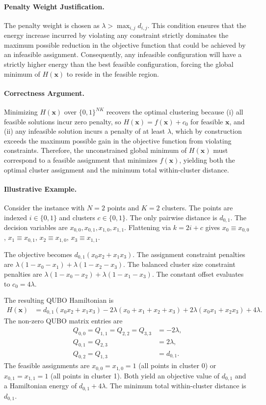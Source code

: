 \documentclass[12pt]{article}
\begin{document}
\paragraph{Penalty Weight Justification.}
The penalty weight is chosen as $\lambda > \max_{i,j} d_{i,j}$. This condition ensures that the energy increase incurred by violating any constraint strictly dominates the maximum possible reduction in the objective function that could be achieved by an infeasible assignment. Consequently, any infeasible configuration will have a strictly higher energy than the best feasible configuration, forcing the global minimum of $H(\mathbf{x})$ to reside in the feasible region.

\paragraph{Correctness Argument.}
Minimizing $H(\mathbf{x})$ over $\{0,1\}^{NK}$ recovers the optimal clustering because (i) all feasible solutions incur zero penalty, so $H(\mathbf{x}) = f(\mathbf{x}) + c_0$ for feasible $\mathbf{x}$, and (ii) any infeasible solution incurs a penalty of at least $\lambda$, which by construction exceeds the maximum possible gain in the objective function from violating constraints. Therefore, the unconstrained global minimum of $H(\mathbf{x})$ must correspond to a feasible assignment that minimizes $f(\mathbf{x})$, yielding both the optimal cluster assignment and the minimum total within-cluster distance.

\paragraph{Illustrative Example.}
Consider the instance with $N=2$ points and $K=2$ clusters. The points are indexed $i \in \{0,1\}$ and clusters $c \in \{0,1\}$. The only pairwise distance is $d_{0,1}$. The decision variables are $x_{0,0}, x_{0,1}, x_{1,0}, x_{1,1}$. Flattening via $k = 2i + c$ gives $x_0 \equiv x_{0,0}$, $x_1 \equiv x_{0,1}$, $x_2 \equiv x_{1,0}$, $x_3 \equiv x_{1,1}$.

The objective becomes $d_{0,1}(x_0 x_2 + x_1 x_3)$.
The assignment constraint penalties are $\lambda(1 - x_0 - x_1) + \lambda(1 - x_2 - x_3)$.
The balanced cluster size constraint penalties are $\lambda(1 - x_0 - x_2) + \lambda(1 - x_1 - x_3)$.
The constant offset evaluates to $c_0 = 4\lambda$.

The resulting QUBO Hamiltonian is
\begin{align}
  H(\mathbf{x}) &= d_{0,1}(x_0 x_2 + x_1 x_3) - 2\lambda(x_0 + x_1 + x_2 + x_3) + 2\lambda(x_0 x_1 + x_2 x_3) + 4\lambda.
\end{align}
The non-zero QUBO matrix entries are
\begin{align}
  Q_{0,0} = Q_{1,1} = Q_{2,2} = Q_{3,3} &= -2\lambda, \\
  Q_{0,1} = Q_{2,3} &= 2\lambda, \\
  Q_{0,2} = Q_{1,3} &= d_{0,1}.
\end{align}
The feasible assignments are $x_{0,0}=x_{1,0}=1$ (all points in cluster 0) or $x_{0,1}=x_{1,1}=1$ (all points in cluster 1). Both yield an objective value of $d_{0,1}$ and a Hamiltonian energy of $d_{0,1} + 4\lambda$. The minimum total within-cluster distance is $d_{0,1}$.
\end{document}
